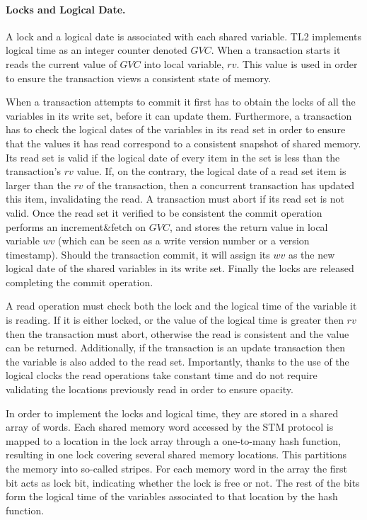 \paragraph{Locks and Logical Date.}
A lock and a logical date is associated with each shared variable.  
TL2 implements logical time as an integer counter denoted $\mathit{GVC}$.
When a transaction starts it reads the current value of $\mathit{GVC}$ into local variable, $\mathit{rv}$. 
This value is used in order to ensure the transaction views a consistent state of memory.

When a transaction attempts to commit it  first  has to  obtain  the  locks  of all the
variables in its write set, before it can  
update them.
Furthermore, a  transaction has to  check the logical dates  of the
variables in its read set in  
order to  ensure that  the values  it has read  correspond to  a consistent
snapshot of shared memory.
Its read set is valid if the logical date of every  item in the set is less than the transaction{}'s $\mathit{rv}$  value. 
If, on the  contrary, the logical date of a read set  item is larger than the $\mathit{rv}$ 
of the transaction,  then  a concurrent  transaction 
has updated this item, invalidating the read.
A transaction must abort if its read set is not valid.  
Once the read set it verified to be consistent the commit operation performs an increment\&fetch on $\mathit{GVC}$, and stores the 
return value in local variable $\mathit{wv}$ (which can be seen as a write version number  or a version timestamp). 
Should the transaction commit, it will assign its $\mathit{wv}$ as the new logical date of the shared variables in its write set.
Finally the locks are released completing the commit operation.

A read operation must check both the lock and the logical time of the variable it is reading.
If it is either locked, or the value of the logical time is greater then $\mathit{rv}$ then the transaction must abort,
otherwise the read is consistent and the value can be returned.
Additionally, if the transaction is an update transaction then the variable is also added to the read set.
Importantly, thanks to the use of the logical clocks the read operations take constant time
and do not require validating the locations previously read in order to ensure opacity.

In order to implement the locks and logical time, they  are stored in  a shared array
of words.
Each shared memory  word accessed by the STM protocol is
mapped to a location in the lock array through a  
one-to-many hash function,  resulting in one
lock covering several shared  
memory locations. This  partitions the memory into  so-called stripes. 
For each memory word in the array
the first bit acts as lock  bit, indicating whether the lock  is free or
not. The rest of the bits form the  
logical time of the variables associated to that location by the hash function.



